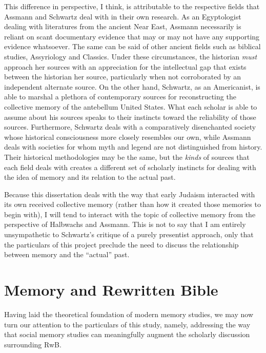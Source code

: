 This difference in perspective, I think, is attributable to the
respective fields that Assmann and Schwartz deal with in their own
research. As an Egyptologist dealing with literatures from the ancient
Near East, Assmann necessarily is reliant on scant documentary evidence
that may or may not have any supporting evidence whatsoever. The same
can be said of other ancient fields such as biblical studies,
Assyriology and Classics. Under these circumstances, the historian
\emph{must} approach her sources with an appreciation for the
intellectual gap that exists between the historian her source,
particularly when not corroborated by an independent alternate source.
On the other hand, Schwartz, as an Americanist, is able to marshal a
plethora of contemporary sources for reconstructing the collective
memory of the antebellum United States. What each scholar is able to
assume about his sources speaks to their instincts toward the
reliability of those sources. Furthermore, Schwartz deals with a
comparatively disenchanted society whose historical consciousness more
closely resembles our own, while Assmann deals with societies for whom
myth and legend are not distinguished from history. Their historical
methodologies may be the same, but the \emph{kinds} of sources that each
field deals with creates a different set of scholarly instincts for
dealing with the idea of memory and its relation to the actual past.

Because this dissertation deals with the way that early Judaism
interacted with its own received collective memory (rather than how it
created those memories to begin with), I will tend to interact with the
topic of collective memory from the perspective of Halbwachs and
Assmann. This is not to say that I am entirely unsympathetic to
Schwartz's critique of a purely presentist approach, only that the
particulars of this project preclude the need to discuss the
relationship between memory and the ``actual'' past.

\hypertarget{memory-and-rwb}{%
\section{Memory and Rewritten Bible}\label{memory-and-rwb}}

Having laid the theoretical foundation of modern memory studies, we may
now turn our attention to the particulars of this study, namely,
addressing the way that social memory studies can meaningfully augment
the scholarly discussion surrounding RwB.\autocite[See
also][]{brooke_zsengeller2014}

